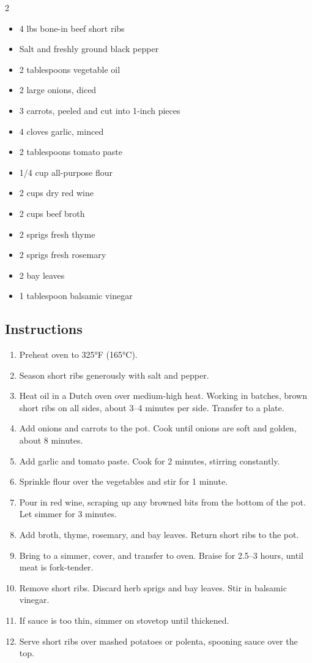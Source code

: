 \documentclass[
    language=english,
    doctype=recipe-book,
    institution=none,
]{../../omnilatex}
\begin{document}
\begin{multicols}{2}
\begin{itemize}[leftmargin=*]
    \item 4 lbs bone-in beef short ribs
    \item Salt and freshly ground black pepper
    \item 2 tablespoons vegetable oil
    \item 2 large onions, diced
    \item 3 carrots, peeled and cut into 1-inch pieces
    \item 4 cloves garlic, minced
    \item 2 tablespoons tomato paste
    \item 1/4 cup all-purpose flour
    \item 2 cups dry red wine
    \item 2 cups beef broth
    \item 2 sprigs fresh thyme
    \item 2 sprigs fresh rosemary
    \item 2 bay leaves
    \item 1 tablespoon balsamic vinegar
\end{itemize}
\end{multicols}

\subsection*{Instructions}

\begin{enumerate}
    \item Preheat oven to 325°F (165°C).
    \item Season short ribs generously with salt and pepper.
    \item Heat oil in a Dutch oven over medium-high heat. Working in batches, brown short ribs on all sides, about 3--4 minutes per side. Transfer to a plate.
    \item Add onions and carrots to the pot. Cook until onions are soft and golden, about 8 minutes.
    \item Add garlic and tomato paste. Cook for 2 minutes, stirring constantly.
    \item Sprinkle flour over the vegetables and stir for 1 minute.
    \item Pour in red wine, scraping up any browned bits from the bottom of the pot. Let simmer for 3 minutes.
    \item Add broth, thyme, rosemary, and bay leaves. Return short ribs to the pot.
    \item Bring to a simmer, cover, and transfer to oven. Braise for 2.5--3 hours, until meat is fork-tender.
    \item Remove short ribs. Discard herb sprigs and bay leaves. Stir in balsamic vinegar.
    \item If sauce is too thin, simmer on stovetop until thickened.
    \item Serve short ribs over mashed potatoes or polenta, spooning sauce over the top.
\end{enumerate}
\end{document}
